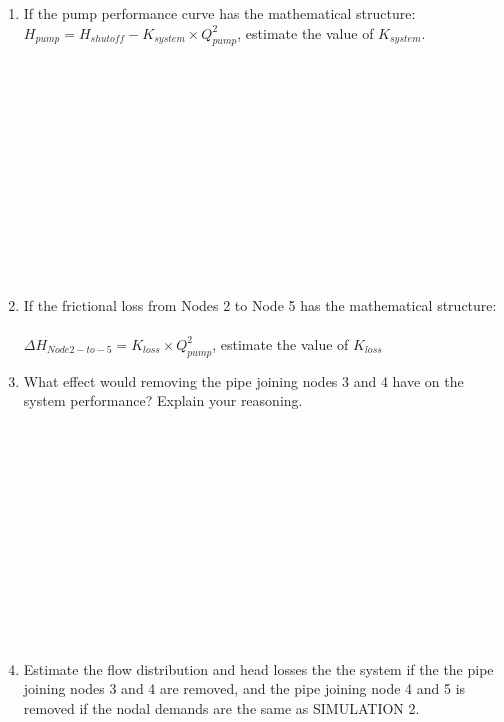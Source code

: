 \documentclass[11pt]{article}
\begin{document}
\begin{enumerate}
\begin{enumerate}
\item If the pump performance curve has the mathematical structure: ~\\
$H_{pump} = H_{shutoff} - K_{system} \times Q_{pump}^2$, estimate the value of $K_{system}$.
\\
\\
\\
\\
\\
\\
\\
\\
\\
\\
\\
\\
\\
\item If the frictional loss from Nodes 2 to Node 5 has the mathematical structure: ~\\
 $\Delta H_{Node 2 -to- 5}= K_{loss} \times Q_{pump}^2$, estimate the value of $K_{loss}$

\clearpage
\item What effect would removing the pipe joining nodes 3 and 4 have on the system performance?   Explain your reasoning.
\\
\\
\\
\\
\\
\\
\\
\\
\\
\\
\\
\\
\\
\item Estimate the flow distribution and head losses the the system if the the pipe joining nodes 3 and 4 are removed, and the pipe joining node 4 and 5 is removed if the nodal demands are the same as SIMULATION  2.
\end{enumerate} 

\begin{figure}[ht!] %
\centering


\end{figure}
\end{enumerate}
\end{document}
